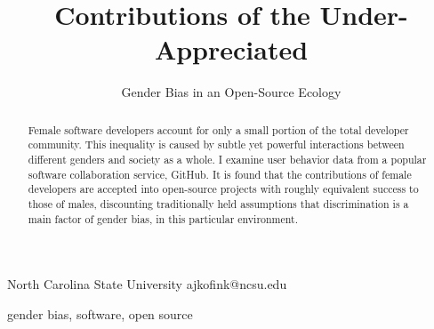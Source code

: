 \documentclass{sigplanconf}
\begin{document}
\setlength{\pdfpageheight}{\paperheight}
\setlength{\pdfpagewidth}{\paperwidth}






\title{Contributions of the Under-Appreciated}
\subtitle{Gender Bias in an Open-Source Ecology}

           {North Carolina State University}
           {ajkofink@ncsu.edu}

\maketitle

\begin{abstract}
  Female software developers account for only a small portion of the total
  developer community. This inequality is caused by subtle yet powerful
  interactions between different genders and society as a whole.
  I examine user behavior data from a popular software collaboration
  service, GitHub. It is found that the contributions of female developers
  are accepted into open-source projects with roughly equivalent success to
  those of males, discounting traditionally held assumptions that discrimination
  is a main factor of gender bias, in this particular environment.
\end{abstract}



\keywords
gender bias, software, open source
\end{document}
